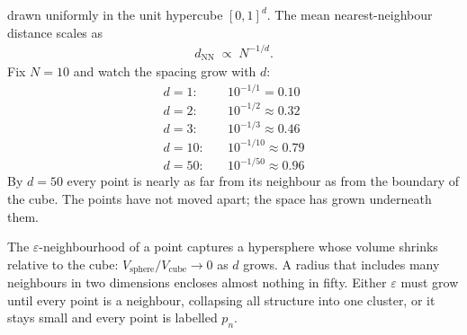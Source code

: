 \begin{marginfigure}[1.5em]
\centering
{}
\caption{Same $N{=}10$ points in $[0,1]^2$: the space has grown from a line to a square, 
and the mean NN spacing rises to $10^{-1/2}{\approx}0.32$.}
\label{fig:cod_spacing_2d}
\end{marginfigure}

 drawn uniformly in the unit hypercube $[0,1]^d$.
The mean nearest-neighbour distance scales as
\begin{align*}
    d_{\mathrm{NN}} \;\propto\; N^{-1/d}.
\end{align*}
Fix $N{=}10$ and watch the spacing grow with $d$:
\begin{align*}
    d =  1: \quad & 10^{-1/1}  = 0.10 \\
    d =  2: \quad & 10^{-1/2}  \approx 0.32 \\
    d = 3: \quad & 10^{-1/3}  \approx 0.46 \\
    d = 10: \quad & 10^{-1/10} \approx 0.79 \\
    d = 50: \quad & 10^{-1/50} \approx 0.96
\end{align*}
By $d{=}50$ every point is nearly as far from its neighbour as from the boundary of the cube.
The points have not moved apart; the space has grown underneath them.

\vspace{1.5em}
 The $\varepsilon$-neighbourhood of a point captures a hypersphere whose volume
shrinks relative to the cube: $V_{\text{sphere}} / V_{\text{cube}} \to 0$ as $d$ grows.
A radius that includes many neighbours in two dimensions encloses almost nothing in fifty.
Either $\varepsilon$ must grow until every point is a neighbour, collapsing all structure into one cluster, or
it stays small and every point is labelled $p_n$.














